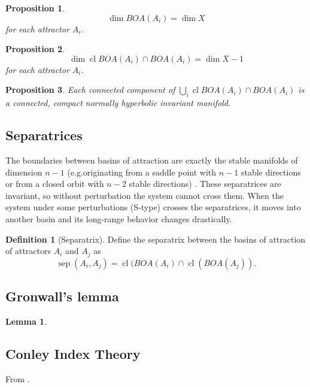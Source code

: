 \documentclass{article}
\newtheorem{proposition}{Proposition}
\newtheorem{lemma}{Lemma}
\theoremstyle{definition}
\newtheorem{definition}{Definition}
\theoremstyle{remark}
\newcommand{\sep}{\operatorname{sep}}
\newcommand{\cl}{\operatorname{cl}}
\newcounter{ct}
\begin{document}

\begin{proposition}
\[\dim BOA(A_i) = \dim X\] for each attractor $A_i$.
\end{proposition}
\begin{proposition}
\[\dim\cl BOA(A_i) \cap BOA(A_i) = \dim X - 1 \] for each attractor $A_i$.
\end{proposition}



\begin{proposition}
Each connected component of $\bigcup_i\cl BOA(A_i) \cap BOA(A_i) $ is a connected, compact normally hyperbolic invariant manifold. %
\end{proposition}


\subsection{Separatrices}
The boundaries between basins of attraction are exactly the stable manifolds of dimension $n-1$ (e.g.originating from a saddle point with $n-1$ stable directions 
or from a closed orbit with $n-2$ stable directions) \citep{gruemm1975stable}.
These separatrices are invariant, so without  perturbation the system cannot cross them.
When the system under some perturbations (S-type) crosses the separatrices, it moves into another basin and its long-range behavior changes drastically.

\begin{definition}[Separatrix]\label{def:separatrix}
Define the separatrix between the basins of attraction of attractors $A_i$ and $A_j$ as 
\begin{equation}
\sep(A_i,A_j) = \cl(BOA(A_i)\cap \cl(BOA(A_j)).
\end{equation}
\end{definition}





\subsection{Gronwall's lemma}\label{sec:gronwall}
\begin{lemma}\label{lemma:gronwall}

\end{lemma}



\subsection{Conley Index Theory}
From \citet{mischaikow1999cit}.
\end{document}
